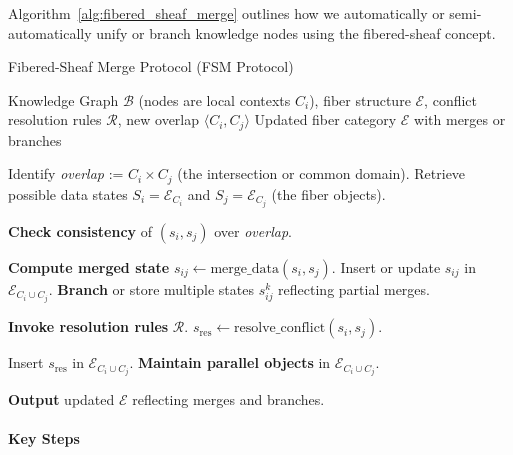 \documentclass{article}
\begin{document}
Algorithm~\ref{alg:fibered_sheaf_merge} outlines how we automatically or semi-automatically unify or branch knowledge nodes using the fibered-sheaf concept.

\begin{algorithm}[t]
\caption{Fibered-Sheaf Merge Protocol (FSM Protocol)}
\label{alg:fibered_sheaf_merge}
\begin{algorithmic}[1]
\REQUIRE Knowledge Graph $\mathcal{B}$ (nodes are local contexts $C_i$), fiber structure $\mathcal{E}$, conflict resolution rules $\mathcal{R}$, new overlap $\langle C_i, C_j \rangle$
\ENSURE Updated fiber category $\mathcal{E}$ with merges or branches

\STATE Identify \textit{overlap} := $C_i \times C_j$ (the intersection or common domain).
\STATE Retrieve possible data states $S_i = \mathcal{E}_{C_i}$ and $S_j = \mathcal{E}_{C_j}$ (the fiber objects).

  \STATE \textbf{Check consistency} of $(s_i, s_j)$ over \textit{overlap}.

    \STATE \textbf{Compute merged state} $s_{ij} \gets \mathrm{merge\_data}(s_i, s_j)$.
      \STATE Insert or update $s_{ij}$ in $\mathcal{E}_{C_i \cup C_j}$.
    \ELSE
      \STATE \textbf{Branch} or store multiple states $s_{ij}^k$ reflecting partial merges.
    \ENDIF

  \ELSE
    \STATE \textbf{Invoke resolution rules} $\mathcal{R}$.
    \STATE $s_{\mathrm{res}} \gets \mathrm{resolve\_conflict}(s_i, s_j)$.

      \STATE %
      \STATE Insert $s_{\mathrm{res}}$ in $\mathcal{E}_{C_i \cup C_j}$.
    \ELSE
      \STATE \textbf{Maintain parallel objects} in $\mathcal{E}_{C_i \cup C_j}$.
    \ENDIF
  \ENDIF

\ENDFOR

\STATE \textbf{Output} updated $\mathcal{E}$ reflecting merges and branches.
\end{algorithmic}
\end{algorithm}

\paragraph{Key Steps}
\end{document}

